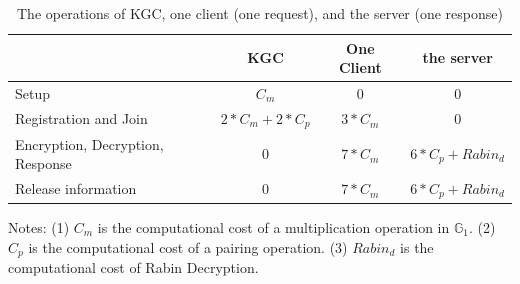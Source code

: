 \documentclass[letterpaper,12pt]{article}
\begin{document}
\begin{table}
\caption{The operations of KGC, one client (one request), and the server (one response)}\label{tab:Computationoverhead:clientsserver}
\centering
\begin{threeparttable}
\begin{tabular}{l| c | c | c }
\hline
& KGC & One Client & the server\\
\hline
Setup&$C_m$ & 0 & 0\\
\hline
Registration and Join &$2\ast C_m+2\ast C_p$ & $3\ast C_m$ & 0\\
\hline
Encryption, Decryption, Response&$0$ & $7\ast C_m$ & $6\ast C_p+Rabin_d$\\
\hline
Release information&$0$ & $7\ast C_m$ & $6\ast C_p+Rabin_d$\\
\hline
\end{tabular}
 Notes:  (1) $C_m$ is the computational cost of a multiplication operation in $\mathbb{G}_1$.
 (2) $C_p$ is the computational cost of a pairing operation.
 (3) $Rabin_d$ is the computational cost of Rabin Decryption.
\end{threeparttable}
\end{table}

\end{document}

